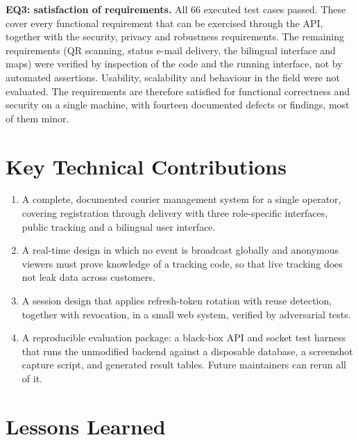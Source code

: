 \textbf{EQ3: satisfaction of requirements.} All 66 executed test cases passed. These cover every functional requirement that can be exercised through the API, together with the security, privacy and robustness requirements. The remaining requirements (QR scanning, status e-mail delivery, the bilingual interface and maps) were verified by inspection of the code and the running interface, not by automated assertions. Usability, scalability and behaviour in the field were not evaluated. The requirements are therefore satisfied for functional correctness and security on a single machine, with fourteen documented defects or findings, most of them minor.

\section{Key Technical Contributions}

\begin{enumerate}
  \item A complete, documented courier management system for a single operator, covering registration through delivery with three role-specific interfaces, public tracking and a bilingual user interface.
  \item A real-time design in which no event is broadcast globally and anonymous viewers must prove knowledge of a tracking code, so that live tracking does not leak data across customers.
  \item A session design that applies refresh-token rotation with reuse detection, together with  revocation, in a small web system, verified by adversarial tests.
  \item A reproducible evaluation package: a black-box API and socket test harness that runs the unmodified backend against a disposable database, a screenshot capture script, and generated result tables. Future maintainers can rerun all of it.
\end{enumerate}

\section{Lessons Learned}

